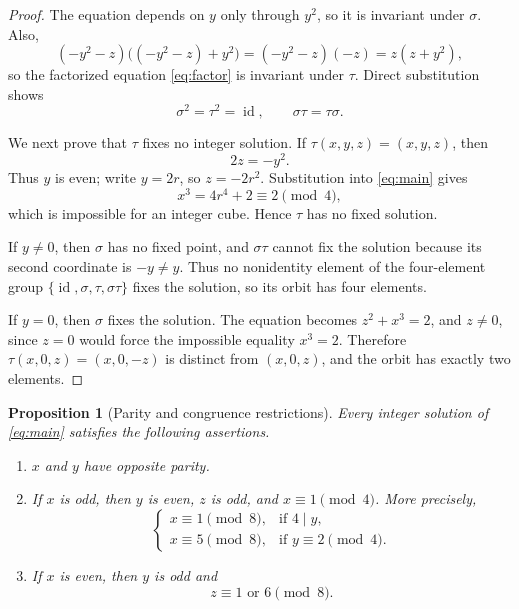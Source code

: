 \documentclass[11pt,a4paper]{amsart}
\newtheorem{proposition}[theorem]{Proposition}
\theoremstyle{remark}
\begin{document}
\begin{proof}
The equation depends on $y$ only through $y^2$, so it is invariant under $\sigma$.  Also,
\[
 (-y^2-z)\bigl((-y^2-z)+y^2\bigr)
 =(-y^2-z)(-z)
 =z(z+y^2),
\]
so the factorized equation \eqref{eq:factor} is invariant under $\tau$.  Direct substitution shows
\[
 \sigma^2=\tau^2=\operatorname{id},
 \qquad \sigma\tau=\tau\sigma.
\]

We next prove that $\tau$ fixes no integer solution.  If $\tau(x,y,z)=(x,y,z)$, then
\[
 2z=-y^2.
\]
Thus $y$ is even; write $y=2r$, so $z=-2r^2$.  Substitution into \eqref{eq:main} gives
\[
 x^3=4r^4+2\equiv2\pmod4,
\]
which is impossible for an integer cube.  Hence $\tau$ has no fixed solution.

If $y\neq0$, then $\sigma$ has no fixed point, and $\sigma\tau$ cannot fix the solution because its second coordinate is $-y\neq y$.  Thus no nonidentity element of the four-element group $\{\operatorname{id},\sigma,\tau,\sigma\tau\}$ fixes the solution, so its orbit has four elements.

If $y=0$, then $\sigma$ fixes the solution.  The equation becomes $z^2+x^3=2$, and $z\neq0$, since $z=0$ would force the impossible equality $x^3=2$.  Therefore $\tau(x,0,z)=(x,0,-z)$ is distinct from $(x,0,z)$, and the orbit has exactly two elements.
\end{proof}

\begin{proposition}[Parity and congruence restrictions]\label{prop:congruences}
Every integer solution of \eqref{eq:main} satisfies the following assertions.

\begin{enumerate}
\item $x$ and $y$ have opposite parity.
\item If $x$ is odd, then $y$ is even, $z$ is odd, and $x\equiv1\pmod4$.  More precisely,
\[
 \begin{cases}
 x\equiv1\pmod8,&\text{if }4\mid y,\\
 x\equiv5\pmod8,&\text{if }y\equiv2\pmod4.
 \end{cases}
\]
\item If $x$ is even, then $y$ is odd and
\[
 z\equiv1\text{ or }6\pmod8.
\]
\end{enumerate}
\end{proposition}
\end{document}
